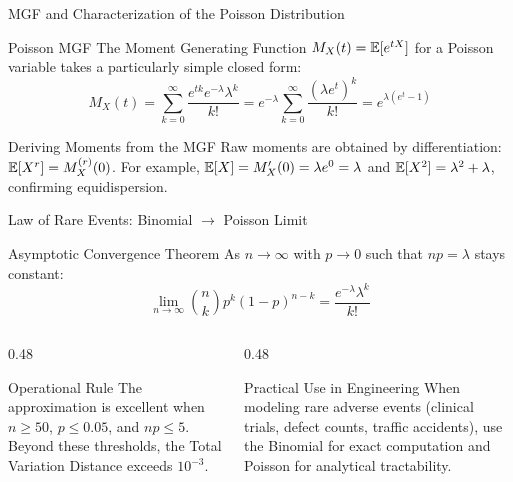 \documentclass[aspectratio=169,xcolor={dvipsnames,table}]{beamer}
\begin{document}
\begin{frame}{MGF and Characterization of the Poisson Distribution}
	\vspace{-0.15cm}
	\begin{block}{Poisson MGF}
		\scriptsize
		The Moment Generating Function $M_{X}(t) = \mathbb{E}[e^{tX}]$ for a Poisson variable takes a particularly simple closed form:
		$$M_{X}(t) = \sum_{k=0}^{\infty} \dfrac{e^{tk} e^{-\lambda} \lambda^{k}}{k!} = e^{-\lambda} \sum_{k=0}^{\infty} \dfrac{(\lambda e^{t})^{k}}{k!} = e^{\lambda(e^{t} - 1)}$$
	\end{block}
	\vspace{-0.15cm}
	\begin{alertblock}{Deriving Moments from the MGF}
		\scriptsize
		Raw moments are obtained by differentiation: $\mathbb{E}[X^{r}] = M_{X}^{(r)}(0)$. For example, $\mathbb{E}[X] = M_{X}'(0) = \lambda e^{0} = \lambda$ and $\mathbb{E}[X^{2}] = \lambda^{2} + \lambda$, confirming equidispersion.
	\end{alertblock}
\end{frame}

\begin{frame}{Law of Rare Events: Binomial $\to$ Poisson Limit}
	\vspace{-0.15cm}
	\begin{block}{Asymptotic Convergence Theorem}
		\scriptsize
		As $n \to \infty$ with $p \to 0$ such that $np = \lambda$ stays constant:
		$$\lim_{n \to \infty} \binom{n}{k} p^{k} (1-p)^{n-k} = \dfrac{e^{-\lambda} \lambda^{k}}{k!}$$
	\end{block}
	\vspace{-0.1cm}
	\begin{columns}[T]
		\begin{column}{0.48\textwidth}
			\begin{exampleblock}{Operational Rule}
				\scriptsize
				The approximation is excellent when $n \ge 50$, $p \le 0.05$, and $np \le 5$. Beyond these thresholds, the Total Variation Distance exceeds $10^{-3}$.
			\end{exampleblock}
		\end{column}
		\begin{column}{0.48\textwidth}
			\begin{alertblock}{Practical Use in Engineering}
				\scriptsize
				When modeling rare adverse events (clinical trials, defect counts, traffic accidents), use the Binomial for exact computation and Poisson for analytical tractability.
			\end{alertblock}
		\end{column}
	\end{columns}
\end{frame}
\end{document}
